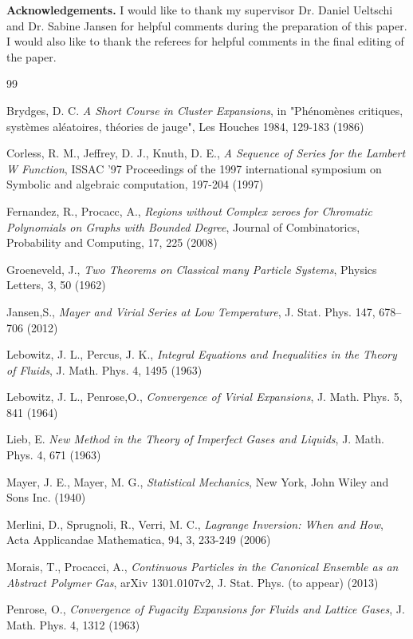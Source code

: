\documentclass[reqno]{amsart}
\numberwithin{equation}{section}
\begin{document}
\medskip\noindent
{\bf Acknowledgements.}
I would like to thank my supervisor Dr. Daniel Ueltschi and Dr. Sabine Jansen for helpful comments during the preparation of this paper. I would also like to thank the referees for helpful comments in the final editing of the paper.
\begin{thebibliography}{99}
 
Brydges, D. C.
{\it A Short Course in Cluster Expansions}, in "Ph\'{e}nom\`{e}nes critiques, syst\`{e}mes al\'{e}atoires, th\'{e}ories de jauge", Les Houches 1984, 129-183 (1986)

Corless, R. M., Jeffrey, D. J.,  Knuth, D. E.,
{\it A Sequence of Series for the Lambert W Function},
ISSAC '97 Proceedings of the 1997 international symposium on Symbolic and algebraic computation, 197-204 (1997)

Fernandez, R., Procacc, A.,
{\it Regions without Complex zeroes for Chromatic Polynomials on Graphs with Bounded Degree},
Journal of Combinatorics, Probability and Computing, 17, 225 (2008)

Groeneveld, J.,
{\it Two Theorems on Classical many Particle Systems},
Physics Letters, 3, 50 (1962)

Jansen,S.,
{\it Mayer and Virial Series at Low Temperature},
J. Stat. Phys. 147, 678--706 (2012)

 Lebowitz, J. L.,  Percus, J. K.,
{\it Integral Equations and Inequalities in the Theory of Fluids},
J. Math. Phys. 4, 1495 (1963)

 Lebowitz, J. L.,  Penrose,O.,
{\it Convergence of Virial Expansions},
J. Math. Phys. 5, 841 (1964)

Lieb, E.
{\it New Method in the Theory of Imperfect Gases and Liquids},
J. Math. Phys. 4, 671 (1963)

 Mayer, J. E.,  Mayer, M. G.,
{\it Statistical Mechanics},
New York, John Wiley and Sons Inc. (1940)

 Merlini, D., Sprugnoli, R.,  Verri, M. C.,
{\it Lagrange Inversion: When and How},
Acta Applicandae Mathematica, 94, 3, 233-249 (2006)

 Morais, T., Procacci, A.,
{\it Continuous Particles in the Canonical Ensemble as an Abstract Polymer Gas},
arXiv 1301.0107v2, J. Stat. Phys. (to appear) (2013)

Penrose, O.,
{\it Convergence of Fugacity Expansions for Fluids and Lattice Gases},
J. Math. Phys. 4, 1312 (1963)


\end{thebibliography}
\end{document}
